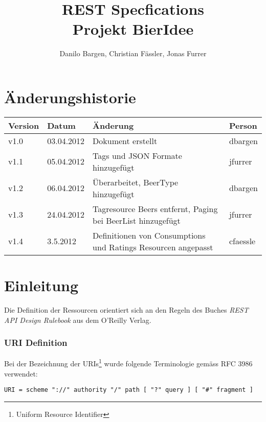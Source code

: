\documentclass[10pt,a4paper]{scrartcl}
\author{Danilo Bargen, Christian Fässler, Jonas Furrer}
\title{REST Specfications\\Projekt BierIdee}
\let\textquotedbl="
\begin{document}
\begin{titlepage}
	\maketitle
	\vspace{120mm}
	\thispagestyle{empty} %
\end{titlepage}

\newpage
	\tableofcontents
\newpage

\section*{Änderungshistorie}
\begin{tabular}{p{}p{}p{}p{}}
\toprule
\textbf{Version} & \textbf{Datum} & \textbf{Änderung} & \textbf{Person} \\  
\midrule
v1.0 & 03.04.2012 & Dokument erstellt & dbargen \\  
\hline 
v1.1 & 05.04.2012 & Tags und JSON Formate hinzugefügt & jfurrer \\
\hline 
v1.2 & 06.04.2012 & Überarbeitet, BeerType hinzugefügt & dbargen \\
\hline 
v1.3 & 24.04.2012 & Tagresource Beers entfernt, Paging bei BeerList hinzugefügt & jfurrer \\
\hline
v1.4 & 3.5.2012 & Definitionen von Consumptions und Ratings Resourcen angepasst & cfaessle\\
\bottomrule
\end{tabular} 
\newpage


\section{Einleitung}

Die Definition der Ressourcen orientiert sich an den Regeln des Buches
\textit{REST API Design Rulebook} \cite{masse2011rest} aus dem O'Reilly Verlag.

\subsubsection*{URI Definition}

Bei der Bezeichnung der URIs\footnote{Uniform Resource Identifier} wurde folgende Terminologie gemäss RFC 3986 verwendet:

\texttt{URI = scheme \textquotedbl ://\textquotedbl{} authority \textquotedbl /\textquotedbl{}
path [ \textquotedbl ?\textquotedbl{} query ] [ \textquotedbl \#\textquotedbl{} fragment ]}
\end{document}
